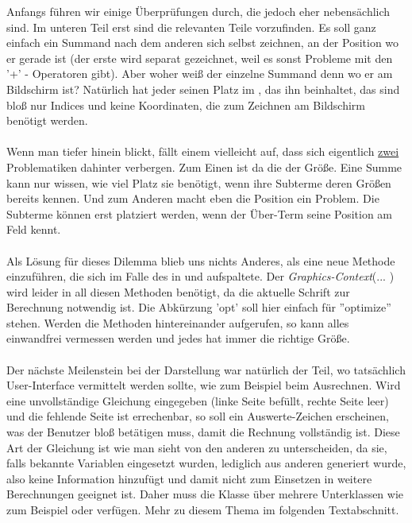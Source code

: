 \noindent
Anfangs führen wir einige Überprüfungen durch, die jedoch eher nebensächlich sind. Im unteren Teil erst sind die relevanten Teile vorzufinden. Es soll ganz einfach ein Summand nach dem anderen sich selbst zeichnen, an der Position wo er gerade ist (der erste wird separat gezeichnet, weil es sonst Probleme mit den '+' - Operatoren gibt). Aber woher weiß der einzelne Summand denn wo er am Bildschirm ist? Natürlich hat jeder seinen Platz im , das ihn beinhaltet, das sind bloß nur Indices und keine Koordinaten, die zum Zeichnen am Bildschirm benötigt werden.\\
\\
Wenn man tiefer hinein blickt, fällt einem vielleicht auf, dass sich eigentlich \underline{zwei} Problematiken dahinter verbergen. Zum Einen ist da die der Größe. Eine Summe kann nur wissen, wie viel Platz sie benötigt, wenn ihre Subterme deren Größen bereits kennen. Und zum Anderen macht eben die Position ein Problem. Die Subterme können erst platziert werden, wenn der Über-Term seine Position am Feld kennt.\\
\\
Als Lösung für dieses Dilemma blieb uns nichts Anderes, als eine neue Methode  einzuführen, die sich im Falle des  in  und  aufspaltete. Der \textit{Graphics-Context}(... ) wird leider in all diesen Methoden benötigt, da die aktuelle Schrift zur Berechnung notwendig ist. Die Abkürzung 'opt' soll hier einfach für ''optimize'' stehen. Werden die Methoden hintereinander aufgerufen, so kann alles einwandfrei vermessen werden und jedes  hat immer die richtige Größe.\\
\\
Der nächste Meilenstein bei der Darstellung war natürlich der Teil, wo tatsächlich User-Interface vermittelt werden sollte, wie zum Beispiel beim Ausrechnen. Wird eine unvollständige Gleichung eingegeben (linke Seite befüllt, rechte Seite leer) und die fehlende Seite ist errechenbar, so soll ein Auswerte-Zeichen erscheinen, was der Benutzer bloß betätigen muss, damit die Rechnung vollständig ist. Diese Art der Gleichung ist wie man sieht von den anderen zu unterscheiden, da sie, falls bekannte Variablen eingesetzt wurden, lediglich aus anderen generiert wurde, also keine Information hinzufügt und damit nicht zum Einsetzen in weitere Berechnungen geeignet ist. Daher muss die Klasse  über mehrere Unterklassen wie zum Beispiel  oder  verfügen. Mehr zu diesem Thema im folgenden Textabschnitt.

